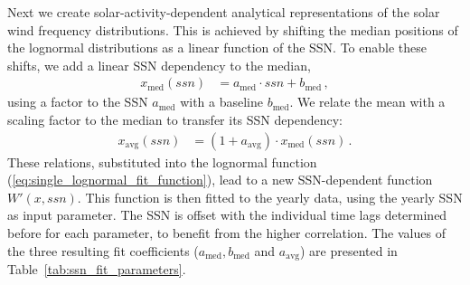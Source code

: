 \documentclass[]{aa}
\begin{document}
        Next we create solar-activity-dependent analytical representations of the solar wind frequency distributions. This is achieved by shifting the median positions of the lognormal distributions as a linear function of the SSN. To enable these shifts, we add a linear SSN dependency to the median,
        \begin{align}
                x_\text{med}(ssn) &= a_\text{med} \cdot ssn + b_\text{med}\,,   \label{eq:median_with_ssn}
        \end{align}
        using a factor to the SSN $a_\text{med}$ with a baseline $b_\text{med}$. We relate the mean with a scaling factor to the median to transfer its SSN dependency:
        \begin{align}
                x_\text{avg}(ssn) &= \left(1 + a_\text{avg}\right) \cdot x_\text{med}(ssn)\,.    \label{eq:mean_with_ssn}
        \end{align}
        These relations, substituted into the lognormal function (\ref{eq:single_lognormal_fit_function}), lead to a new SSN-dependent function $W'(x,ssn)$. This function is then fitted to the yearly data, using the yearly SSN as input parameter. The SSN is offset with the individual time lags determined before for each parameter, to benefit from the higher correlation. The values of the three resulting fit coefficients ($a_\text{med}, b_\text{med}$ and $a_\text{avg}$) are presented in Table~\ref{tab:ssn_fit_parameters}.
\end{document}
